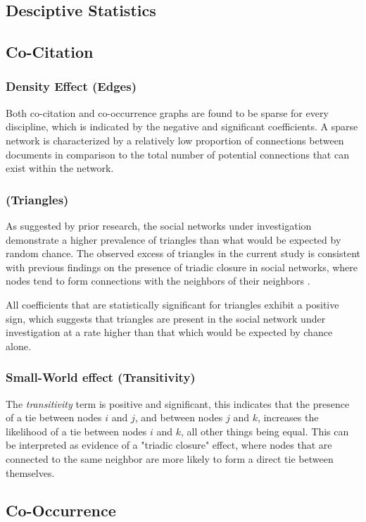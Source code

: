 
\subsection{Desciptive Statistics}



\subsection{Co-Citation}


\subsubsection{Density Effect (Edges)}

Both co-citation and co-occurrence graphs are found to be sparse for every discipline, which is indicated by the negative and significant coefficients. A sparse network is characterized by a relatively low proportion of connections between documents in comparison to the total number of potential connections that can exist within the network.

\subsubsection{ (Triangles)}

As suggested by prior research, the social networks under investigation demonstrate a higher prevalence of triangles than what would be expected by random chance. The observed excess of triangles in the current study is consistent with previous findings on the presence of triadic closure in social networks, where nodes tend to form connections with the neighbors of their neighbors \citep{burt2000}.

All coefficients that are statistically significant for triangles exhibit a positive sign, which suggests that triangles are present in the social network under investigation at a rate higher than that which would be expected by chance alone.

\subsubsection{Small-World effect (Transitivity)}

The \emph{transitivity} term is positive and significant, this indicates that the presence of a tie between nodes $i$ and $j$, and between nodes $j$ and $k$, increases the likelihood of a tie between nodes $i$ and $k$, all other things being equal. This can be interpreted as evidence of a "triadic closure" effect, where nodes that are connected to the same neighbor are more likely to form a direct tie between themselves.

\subsection{Co-Occurrence}







